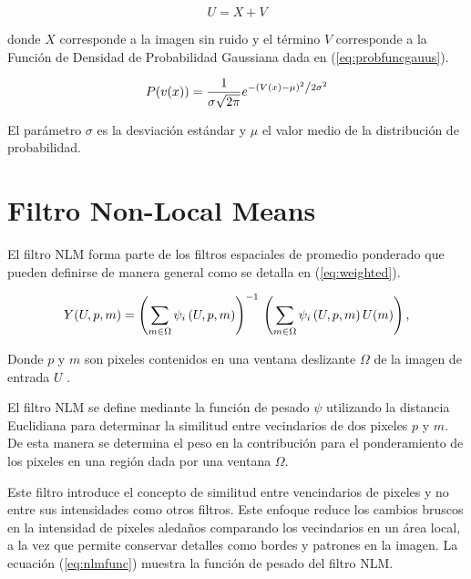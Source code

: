 \begin{equation}
\label{eq:modelruido}
U = X + V
\end{equation}

 donde $X$ corresponde a la imagen sin ruido y el t\'ermino $V$ corresponde a la Funci\'on de Densidad de Probabilidad Gaussiana dada en (\ref{eq:probfuncgauus}).

\begin{equation}
\label{eq:probfuncgauus}
P(v(x)) = \frac{1}{{\sigma \sqrt {2\pi } }}e^{{{ - \left( {V(x) - \mu } \right)^2 } \mathord{\left/ {\vphantom {{ - \left( {x - \mu } \right)^2 } {2\sigma ^2 }}} \right. \kern-\nulldelimiterspace} {2\sigma ^2 }}}
\end{equation}

El par\'ametro $\sigma$ es la desviaci\'on est\'andar  y $\mu$ el valor medio de la distribuci\'on de probabilidad.


\section{Filtro Non-Local Means}
\label{ch:marco_nlm}

El filtro NLM forma parte de los filtros espaciales de promedio ponderado que pueden definirse de manera general como se detalla en (\ref{eq:weighted}).

\begin{equation}
\label{eq:weighted}
Y(U,p,m)=\left(\sum_{m\in \Omega}\psi_{i}\left(U, p, m\right)\right)^{-1} \\ \left(\sum_{m\in \Omega}\psi_{i}\left(U, p, m\right)U(m)\right),
\end{equation}

Donde $p$ y $m$ son pixeles contenidos en una ventana deslizante $\Omega$ de la imagen de entrada $U$ \cite{calderon2015dewaff}.

El filtro NLM se define mediante la funci\'on de pesado $\psi$ utilizando la distancia Euclidiana para determinar la similitud entre vecindarios de dos pixeles $p$ y $m$. De esta manera se determina el peso en la contribuci\'on para el ponderamiento de los pixeles en una regi\'on dada por una ventana $\Omega$. 

Este filtro introduce el concepto de similitud entre vencindarios de pixeles y no entre sus intensidades como otros filtros. Este enfoque reduce los cambios bruscos en la intensidad de pixeles aleda\~nos comparando los vecindarios en un \'area local, a la vez que permite conservar detalles como bordes y patrones en la imagen\cite{calderon2015dewaff}. La ecuaci\'on (\ref{eq:nlmfunc}) muestra la funci\'on de pesado del filtro NLM.

